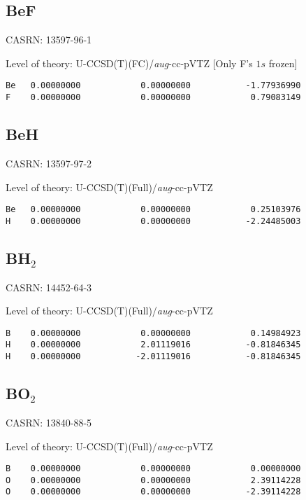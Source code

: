 \documentclass[journal=jctcce,manuscript=article,layout=traditional]{achemso}
\newcommand{\AVTZ}{\emph{aug}-cc-pVTZ}
\begin{document}
\subsection{BeF}

CASRN: 13597-96-1

\begin{singlespace}
\noindent Level of theory: U-CCSD(T)(FC)/{\AVTZ} [Only F's $1s$ frozen]
\begin{verbatim}
Be   0.00000000            0.00000000           -1.77936990   
F    0.00000000            0.00000000            0.79083149   
\end{verbatim}
\end{singlespace}

\subsection{BeH}

CASRN: 13597-97-2

\begin{singlespace}
\noindent Level of theory: U-CCSD(T)(Full)/{\AVTZ}
\begin{verbatim}
Be   0.00000000            0.00000000            0.25103976
H    0.00000000            0.00000000           -2.24485003
\end{verbatim}
\end{singlespace}

\subsection{BH$_2$}

CASRN:  14452-64-3

\begin{singlespace}
\noindent Level of theory: U-CCSD(T)(Full)/{\AVTZ}
\begin{verbatim}
B    0.00000000            0.00000000            0.14984923
H    0.00000000            2.01119016           -0.81846345
H    0.00000000           -2.01119016           -0.81846345
 \end{verbatim}
\end{singlespace}

\subsection{BO$_2$}

CASRN:  13840-88-5

\begin{singlespace}
\noindent Level of theory: U-CCSD(T)(Full)/{\AVTZ}
\begin{verbatim}
B    0.00000000            0.00000000            0.00000000 
O    0.00000000            0.00000000            2.39114228 
O    0.00000000            0.00000000           -2.39114228 
 \end{verbatim}
\end{singlespace}
\end{document}

